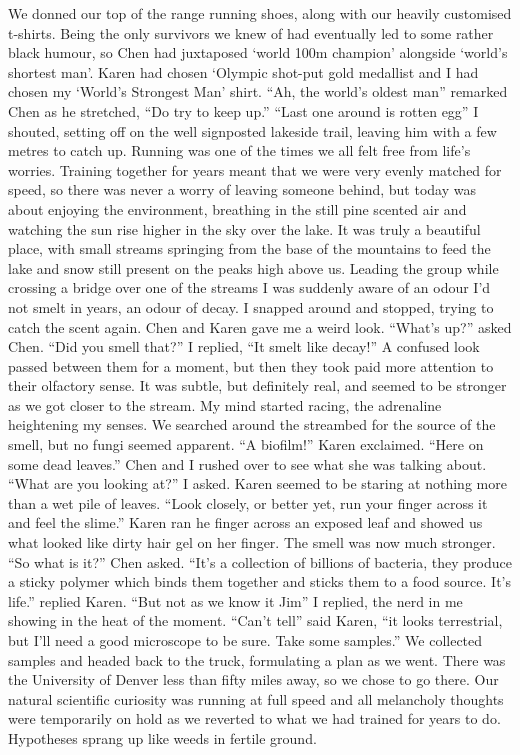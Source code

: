 \documentclass[a4paper]{article}
\begin{document}
We donned our top of the range running shoes, along with our heavily customised t-shirts. Being the only survivors we knew of had eventually led to some rather black humour, so Chen had juxtaposed ‘world 100m champion’ alongside ‘world’s shortest man’. Karen had chosen ‘Olympic shot-put gold medallist and I had chosen my ‘World’s Strongest Man’ shirt.
“Ah, the world’s oldest man” remarked Chen as he stretched, “Do try to keep up.”
“Last one around is rotten egg” I shouted, setting off on the well signposted lakeside trail, leaving him with a few metres to catch up.
Running was one of the times we all felt free from life’s worries. Training together for years meant that we were very evenly matched for speed, so there was never a worry of leaving someone behind, but today was about enjoying the environment, breathing in the still pine scented air and watching the sun rise higher in the sky over the lake. It was truly a beautiful place, with small streams springing from the base of the mountains to feed the lake and snow still present on the peaks high above us. Leading the group while crossing a bridge over one of the streams I was suddenly aware of an odour I’d not smelt in years, an odour of decay. I snapped around and stopped, trying to catch the scent again. Chen and Karen gave me a weird look.
“What’s up?” asked Chen.
“Did you smell that?” I replied, “It smelt like decay!”
A confused look passed between them for a moment, but then they took paid more attention to their olfactory sense. It was subtle, but definitely real, and seemed to be stronger as we got closer to the stream. My mind started racing, the adrenaline heightening my senses. We searched around the streambed for the source of the smell, but no fungi seemed apparent.
“A biofilm!” Karen exclaimed. “Here on some dead leaves.”
Chen and I rushed over to see what she was talking about.
“What are you looking at?” I asked. Karen seemed to be staring at nothing more than a wet pile of leaves.
“Look closely, or better yet, run your finger across it and feel the slime.” Karen ran he finger across an exposed leaf and showed us what looked like dirty hair gel on her finger. The smell was now much stronger.
“So what is it?” Chen asked.
“It’s a collection of billions of bacteria, they produce a sticky polymer which binds them together and sticks them to a food source. It’s life.” replied Karen.
“But not as we know it Jim” I replied, the nerd in me showing in the heat of the moment.
“Can’t tell” said Karen, “it looks terrestrial, but I’ll need a good microscope to be sure. Take some samples.”
We collected samples and headed back to the truck, formulating a plan as we went. There was the University of Denver less than fifty miles away, so we chose to go there. Our natural scientific curiosity was running at full speed and all melancholy thoughts were temporarily on hold as we reverted to what we had trained for years to do. Hypotheses sprang up like weeds in fertile ground.
\end{document}
